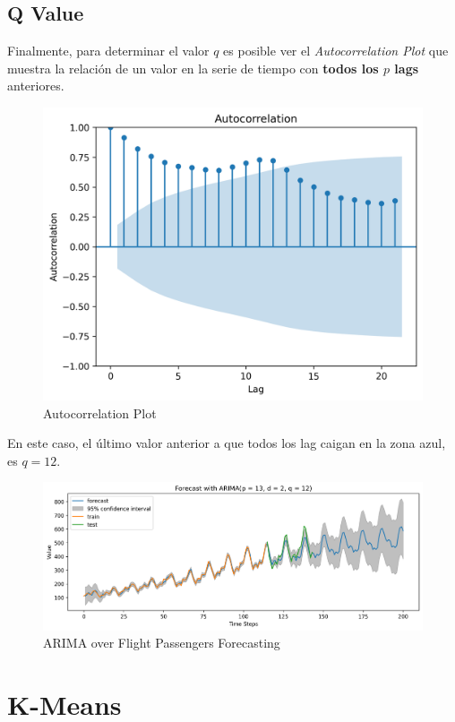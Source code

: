 \subsection{Q Value}
Finalmente, para determinar el valor $q$ es posible ver el \textit{Autocorrelation Plot} que muestra la relación de un valor en la serie de tiempo con \textbf{todos los $p$ lags} anteriores. 
\begin{figure}[H]
    \center
    \includegraphics[scale=0.5]{notebooks/ML/img/autocorrelation.png}
    \caption{Autocorrelation Plot}
\end{figure}
En este caso, el último valor anterior a que todos los lag caigan en la zona azul, es $q=12$.
\begin{figure}[H]
    \center
    \includegraphics[scale=0.5]{notebooks/ML/img/arima_results.png}
    \caption{ARIMA over Flight Passengers Forecasting}
\end{figure}

\section{K-Means}

